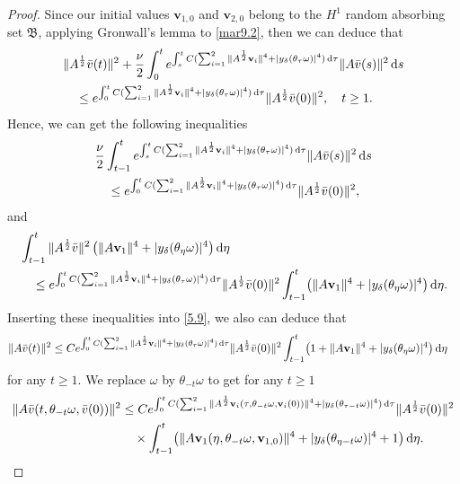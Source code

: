 \documentclass{elsarticle}
\theoremstyle{definition}
\numberwithin{equation}{section}
\renewcommand{\d}{{\rm{d}}}
\begin{document}
\begin{proof}
Since our initial values $\textbf{v}_{1,0}$ and $\textbf{v}_{2,0}$   belong to the $H^1$ random  absorbing set  $\mathfrak B$,  applying Gronwall's lemma to \eqref{mar9.2}, then we can deduce    that
\begin{align}
 & \|A^\frac12\bar{v}(t)\|^2 + \frac{\nu}{2} \int_0^te^{\int_s^tC( \sum_{i=1}^2 \|A^\frac12\textbf{v}_i\|^4+|y_\delta(\theta_\tau\omega)|^4)\, \d \tau}\|A\bar{v}(s) \|^2\, \d s
\nonumber\\
&\quad \leq e^{\int_0^tC( \sum_{i=1}^2 \|A^\frac12\textbf{v}_i\|^4+|y_\delta(\theta_\tau\omega)|^4)\, \d \tau}\|A^\frac12\bar{v}(0)\|^2,\quad t\geq 1. \nonumber
\end{align}
Hence, we can get the  following inequalities
\begin{align}
& \frac{\nu}{2} \int_{t-1}^te^{\int_s^tC( \sum_{i=1}^2 \|A^\frac12\textbf{v}_i\|^4+|y_\delta(\theta_\tau\omega)|^4)\, \d \tau}\|A\bar{v}(s)\|^2\, \d s\nonumber\\
&\quad \leq e^{\int_{0}^tC( \sum_{i=1}^2 \|A^\frac12\textbf{v}_i\|^4+|y_\delta(\theta_\tau \omega)|^4)\, \d \tau}\|A^\frac12\bar{v}(0)\|^2, \nonumber
\end{align}
and
\begin{align}
&
\int_{t-1}^t\|A^\frac12\bar{v}\|^2 \left (\|A\textbf{v}_1\|^4+|y_\delta(\theta_\eta\omega)|^4\right) \d \eta\nonumber\\
&\quad \leq e^{\int_0^tC( \sum_{i=1}^2 \|A^\frac12\textbf{v}_i\|^4+|y_\delta(\theta_\tau\omega)|^4)\, \d \tau}\|A^\frac12\bar{v}(0)\|^2
\int_{t-1}^t \!  \left (\|A\textbf{v}_1\|^4+|y_\delta(\theta_\eta\omega)|^4\right) \d \eta.\nonumber
\end{align}
Inserting these inequalities  into \eqref{5.9}, we also can deduce that
\begin{align}
 \|A\bar{v}(t)\|^2
&\leq Ce^{\int_0^tC( \sum_{i=1}^2 \|A^\frac12\textbf{v}_i\|^4+|y_\delta(\theta_\tau\omega)|^4)\, \d \tau}\|A^\frac12\bar{v}(0)\|^2
\int_{t-1}^t  \! \left (1+\|A\textbf{v}_1\|^4+|y_\delta(\theta_\eta\omega)|^4\right)  \d \eta   \nonumber
\end{align}
for any $t\geq 1$.
We replace $\omega$ by $\theta_{-t}\omega$ to  get  for any $ t\geq 1$
\begin{align} \label{mar11.1}
 \|A\bar{v}(t,\theta_{-t}\omega,\bar{v}(0))\|^2
&\leq Ce^{\int_0^tC( \sum_{i=1}^2\|A^\frac12\textbf{v}_i(\tau,\theta_{-t}\omega,\textbf{v}_i(0))\|^4
+|y_\delta(\theta_{\tau-t}\omega)|^4)\, \d \tau}\|A^\frac12\bar{v}(0)\|^2\nonumber\\
&\quad  \times \int_{t-1}^t  \! \left ( \|A\textbf{v}_1(\eta,\theta_{-t}\omega,\textbf{v}_{1,0})\|^4+|y_\delta(\theta_{\eta-t}\omega)|^4+1\right) \d \eta.
\end{align}



\end{proof}
\end{document}
